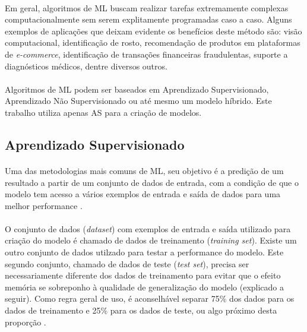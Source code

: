 \paragraph{} Em geral, algoritmos de ML buscam realizar tarefas extremamente complexas computacionalmente sem serem explitamente programadas caso a caso. Alguns exemplos de aplicações que deixam evidente os benefícios deste método são: visão computacional, identificação de rosto, recomendação de produtos em plataformas de \textit{e-commerce}, identificação de transações financeiras fraudulentas, suporte a diagnósticos médicos, dentre diversos outros.

\paragraph{} Algoritmos de ML podem ser baseados em Aprendizado Supervisionado, Aprendizado Não Supervisionado ou até mesmo um modelo híbrido. Este trabalho utiliza apenas AS para a criação de modelos.


\subsection{Aprendizado Supervisionado}

\paragraph{} Uma das metodologias mais comuns de ML, seu objetivo é a predição de um resultado a partir de um conjunto de dados de entrada, com a condição de que o modelo tem acesso a vários exemplos de entrada e saída de dados para uma melhor performance \cite{muller2016introduction}.

\paragraph{} O conjunto de dados (\textit{dataset}) com exemplos de entrada e saída utilizado para criação do modelo é chamado de dados de treinamento (\textit{training set}). Existe um outro conjunto de dados utilzado para testar a performance do modelo. Este segundo conjunto, chamado de dados de teste (\textit{test set}), precisa ser necessariamente diferente dos dados de treinamento para evitar que o efeito memória se sobreponho à qualidade de generalização do modelo (explicado a seguir). Como regra geral de uso, é aconselhável separar 75\% dos dados para os dados de treinamento e 25\% para os dados de teste, ou algo próximo desta proporção \cite{muller2016introduction}.

